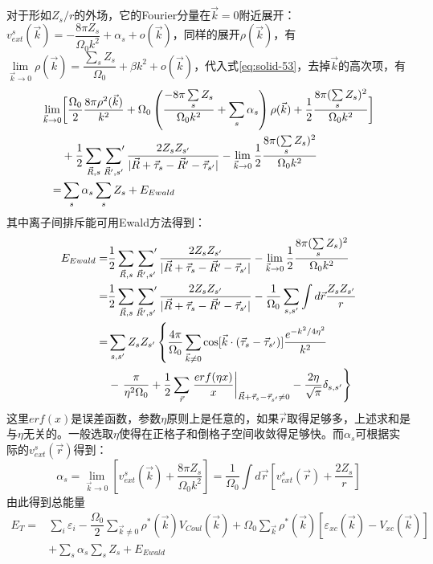 对于形如$Z_s/r$的外场，它的Fourier分量在$\vec k=0$附近展开：$v_{ext}^s(\vec k)=-\dfrac{8\pi Z_s}{\Omega_0k^2}+\alpha_s+o(\vec k)$，同样的展开$\rho(\vec k)$，有$\lim\limits_{\vec k\rightarrow0}\rho(\vec k)=\dfrac{\sum\limits_sZ_s}{\Omega_0}+\beta k^2+o(\vec k)$，代入式\eqref{eq:solid-53}，去掉$\vec k$的高次项，有
\begin{equation}
  \begin{split}
    \lim\limits_{\vec k\rightarrow0}&\biggl[\dfrac{\Omega_0}2\dfrac{8\pi\rho^2(\vec k)}{k^2}+\Omega_0\left(\dfrac{-8\pi\sum\limits_sZ_s}{\Omega_0k^2}+\sum_s\alpha_s\right)\rho(\vec k)+\frac12\dfrac{8\pi(\sum\limits_sZ_s)^2}{\Omega_0k^2}\biggr]\\
    &+\frac12\sum_{\vec R,s}\sideset{}{'}\sum_{\vec R',s'}\dfrac{2Z_sZ_{s'}}{|\vec R+\vec{\tau}_s-\vec R'-\vec{\tau}_{s'}|}-\lim\limits_{\vec k\rightarrow0}\frac12\dfrac{8\pi(\sum\limits_sZ_s)^2}{\Omega_0k^2}\\
    =&\sum_s\alpha_s\sum_sZ_s+E_{Ewald}
  \end{split}
  \label{eq:solid-54}
\end{equation}
其中离子间排斥能可用Ewald方法得到\cite{Born-Huang}：
\begin{equation}
  \begin{split}
    E_{Ewald}=&\frac12\sum_{\vec R,s}\sideset{}{'}\sum_{\vec R',s'}\dfrac{2Z_sZ_{s'}}{|\vec R+\vec{\tau}_s-\vec R'-\vec{\tau}_{s'}|}-\lim\limits_{\vec k\rightarrow0}\frac12\dfrac{8\pi(\sum\limits_sZ_s)^2}{\Omega_0k^2} \\
    =&\frac12\sum_{\vec R,s}\sideset{}{'}\sum_{\vec R',s'}\dfrac{2Z_sZ_{s'}}{|\vec R+\vec{\tau}_s-\vec R'-\vec{\tau}_{s'}|}-\frac1{\Omega_0}\sum_{s,s'}\int d\vec r\frac{Z_sZ_{s'}}r \\
    =&\sum_{s,s'}Z_sZ_{s'}\left\{\frac{4\pi}{\Omega_0}\sum_{\vec k\neq0}\cos[\vec k\cdot(\vec{\tau}_s-\vec{\tau}_{s'})]\dfrac{e^{-k^2/4\eta^2}}{k^2}\right.\\
    &-\left.\frac{\pi}{\eta^2\Omega_0}+\frac12\sum_{\vec r}\left.\dfrac{erf(\eta x)}x\right|_{\vec R+\vec{\tau}_s-\vec{\tau}_{s'}\neq0}-\dfrac{2\eta}{\sqrt{\pi}}\delta_{s,s'}\right\}
  \end{split}
  \label{eq:solid-55}
\end{equation}
这里$erf(x)$是误差函数，参数$\eta$原则上是任意的，如果$\vec r$取得足够多，上述求和是与$\eta$无关的。一般选取$\eta$使得在正格子和倒格子空间收敛得足够快。而$\alpha_s$可根据实际的$v_{ext}^s(\vec r)$得到：
\begin{equation}
  \alpha_s=\lim\limits_{\vec k\rightarrow0}\left[v_{ext}^s(\vec k)+\dfrac{8\pi Z_s}{\Omega_0k^2}\right]=\dfrac1{\Omega_0}\int d\vec r\left[v_{ext}^s(\vec r)+\dfrac{2Z_s}r\right]
  \label{eq:solid-56}
\end{equation}
由此得到总能量
\begin{equation}
  \begin{split}
   E_T=&\sum_i\varepsilon_i-\dfrac{\Omega_0}2\sum_{\vec k\neq0}\rho^{\ast}(\vec k)V_{Coul}(\vec k)+\Omega_0\sum_{\vec k}\rho^{\ast}(\vec k)[\varepsilon_{xc}(\vec k)-V_{xc}(\vec k)]\\
   &+\sum_s\alpha_s\sum_sZ_s+E_{Ewald}
  \label{eq:solid-57}
  \end{split}
\end{equation}


